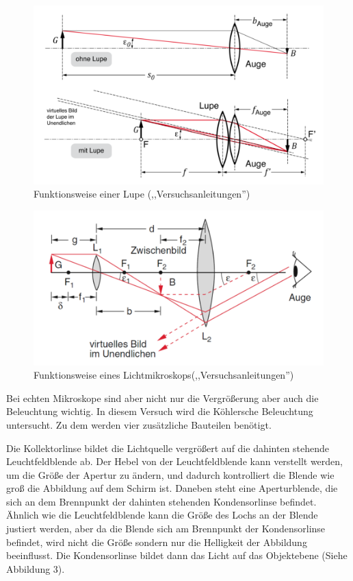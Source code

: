 \documentclass[11pt,a4paper]{article}
\begin{document}
\begin{figure}
	\centering
	\includegraphics[width=\linewidth]{Abb1}
	\caption{Funktionsweise einer Lupe (,,Versuchsanleitungen'')}
\end{figure}

\begin{figure}
	\centering
	\includegraphics[width=\linewidth]{Abb2}
	\caption{Funktionsweise eines Lichtmikroskops(,,Versuchsanleitungen'')}
\end{figure}

Bei echten Mikroskope sind aber nicht nur die Vergrößerung aber auch die Beleuchtung wichtig. In diesem Versuch wird die Köhlersche Beleuchtung untersucht. Zu dem werden vier zusätzliche Bauteilen benötigt. 

Die Kollektorlinse bildet die Lichtquelle vergrößert auf die dahinten stehende Leuchtfeldblende ab. Der Hebel von der Leuchtfeldblende kann verstellt werden, um die Größe der Apertur zu ändern, und dadurch kontrolliert die Blende wie groß die Abbildung auf dem Schirm ist. Daneben steht eine Aperturblende, die sich an dem Brennpunkt der dahinten stehenden Kondensorlinse befindet. Ähnlich wie die Leuchtfeldblende kann die Größe des Lochs an der Blende justiert werden, aber da die Blende sich am Brennpunkt der Kondensorlinse befindet, wird nicht die Größe sondern nur die Helligkeit der Abbildung beeinflusst. Die Kondensorlinse bildet dann das Licht auf das Objektebene (Siehe Abbildung 3).
\end{document}
